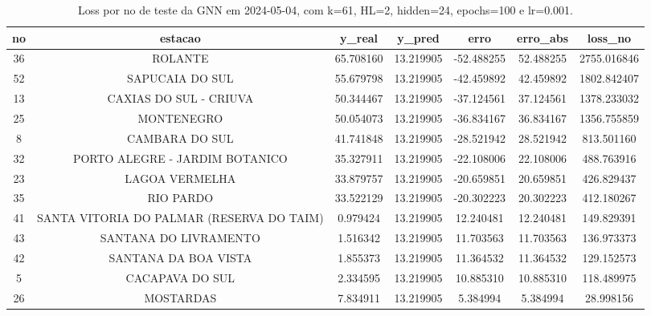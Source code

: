 \begin{table}[h]
\centering
\caption{Loss por no de teste da GNN em 2024-05-04, com k=61, HL=2, hidden=24, epochs=100 e lr=0.001.}
\label{tab:gnn_loss_k61_hl2_h24_e100_d20240504}
\begin{tabular}{ccccccc}
\toprule
no & estacao & y\_real & y\_pred & erro & erro\_abs & loss\_no \\
\midrule
36 & ROLANTE & 65.708160 & 13.219905 & -52.488255 & 52.488255 & 2755.016846 \\
52 & SAPUCAIA DO SUL & 55.679798 & 13.219905 & -42.459892 & 42.459892 & 1802.842407 \\
13 & CAXIAS DO SUL - CRIUVA & 50.344467 & 13.219905 & -37.124561 & 37.124561 & 1378.233032 \\
25 & MONTENEGRO & 50.054073 & 13.219905 & -36.834167 & 36.834167 & 1356.755859 \\
8 & CAMBARA DO SUL & 41.741848 & 13.219905 & -28.521942 & 28.521942 & 813.501160 \\
32 & PORTO ALEGRE - JARDIM BOTANICO & 35.327911 & 13.219905 & -22.108006 & 22.108006 & 488.763916 \\
23 & LAGOA VERMELHA & 33.879757 & 13.219905 & -20.659851 & 20.659851 & 426.829437 \\
35 & RIO PARDO & 33.522129 & 13.219905 & -20.302223 & 20.302223 & 412.180267 \\
41 & SANTA VITORIA DO PALMAR (RESERVA DO TAIM) & 0.979424 & 13.219905 & 12.240481 & 12.240481 & 149.829391 \\
43 & SANTANA DO LIVRAMENTO & 1.516342 & 13.219905 & 11.703563 & 11.703563 & 136.973373 \\
42 & SANTANA DA BOA VISTA & 1.855373 & 13.219905 & 11.364532 & 11.364532 & 129.152573 \\
5 & CACAPAVA DO SUL & 2.334595 & 13.219905 & 10.885310 & 10.885310 & 118.489975 \\
26 & MOSTARDAS & 7.834911 & 13.219905 & 5.384994 & 5.384994 & 28.998156 \\
\bottomrule
\end{tabular}
\end{table}
